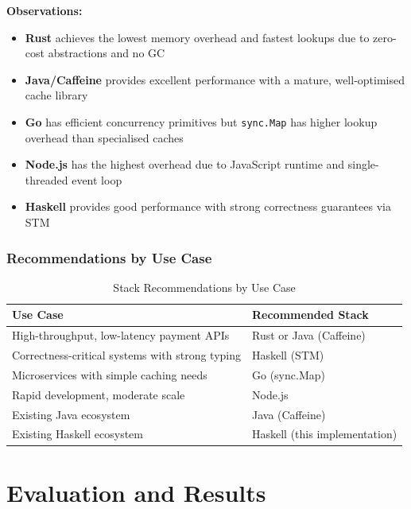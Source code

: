 \documentclass[12pt,a4paper]{report}
\begin{document}
\textbf{Observations:}
\begin{itemize}
    \item \textbf{Rust} achieves the lowest memory overhead and fastest lookups due to zero-cost abstractions and no GC
    \item \textbf{Java/Caffeine} provides excellent performance with a mature, well-optimised cache library
    \item \textbf{Go} has efficient concurrency primitives but \texttt{sync.Map} has higher lookup overhead than specialised caches
    \item \textbf{Node.js} has the highest overhead due to JavaScript runtime and single-threaded event loop
    \item \textbf{Haskell} provides good performance with strong correctness guarantees via STM
\end{itemize}

\subsection{Recommendations by Use Case}

\begin{table}[h]
\centering
\begin{tabular}{@{} l l @{}}
\toprule
\textbf{Use Case} & \textbf{Recommended Stack} \\
\midrule
High-throughput, low-latency payment APIs & Rust or Java (Caffeine) \\
Correctness-critical systems with strong typing & Haskell (STM) \\
Microservices with simple caching needs & Go (sync.Map) \\
Rapid development, moderate scale & Node.js \\
Existing Java ecosystem & Java (Caffeine) \\
Existing Haskell ecosystem & Haskell (this implementation) \\
\bottomrule
\end{tabular}
\caption{Stack Recommendations by Use Case}
\label{tab:stack-recommendations}
\end{table}


\chapter{Evaluation and Results}
\end{document}
